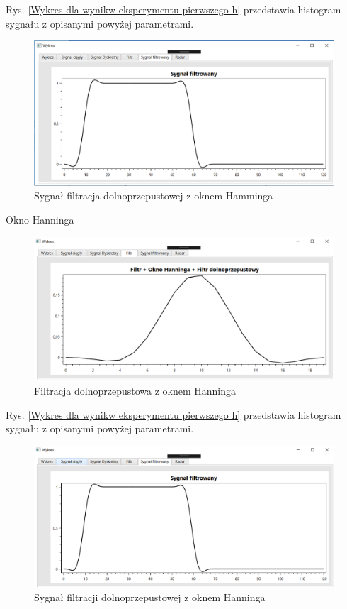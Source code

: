 \documentclass[12pt]{article}
\begin{document}
\newpage
Rys. \ref{Wykres dla wynikw eksperymentu pierwszego h} przedstawia histogram sygnału z opisanymi powyżej parametrami. 
\begin{figure}[h!]
 \centering
 \includegraphics[width=12.3cm]{prostSFDHm.PNG}
 \vspace{-0.3cm}
 \caption{Sygnał filtracja dolnoprzepustowej z oknem Hamminga}
 \label{Histogram dla wyników eksperymentu drugiego}
\end{figure}

\newpage
Okno Hanninga
\begin{figure}[h!]
 \centering
 \includegraphics[width=12.3cm]{prostFDOHn.PNG}
 \vspace{-0.3cm}
 \caption{Filtracja dolnoprzepustowa z oknem Hanninga}
 \label{Wykres dla wyników eksperymentu drugiego}
\end{figure}
\newpage
Rys. \ref{Wykres dla wynikw eksperymentu pierwszego h} przedstawia histogram sygnału z opisanymi powyżej parametrami. 
\begin{figure}[h!]
 \centering
 \includegraphics[width=12.3cm]{prostSFDHn.PNG}
 \vspace{-0.3cm}
 \caption{Sygnał filtracji dolnoprzepustowej z oknem Hanninga}
 \label{Histogram dla wyników eksperymentu drugiego}
\end{figure}
\end{document}
